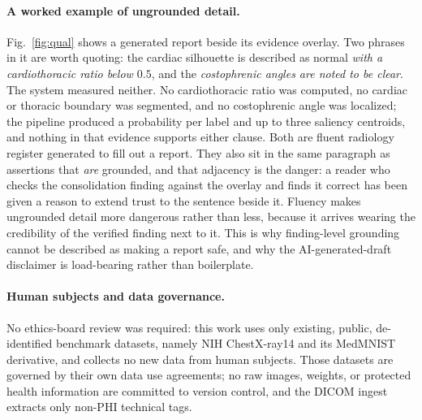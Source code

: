 \documentclass[10pt,twocolumn]{article}
\begin{document}
\paragraph{A worked example of ungrounded detail.} Fig.~\ref{fig:qual} shows a
generated report beside its evidence overlay. Two phrases in it are worth quoting:
the cardiac silhouette is described as normal \emph{with a cardiothoracic ratio
below $0.5$}, and the \emph{costophrenic angles are noted to be clear}. The system
measured neither. No cardiothoracic ratio was computed, no cardiac or thoracic
boundary was segmented, and no costophrenic angle was localized; the pipeline
produced a probability per label and up to three saliency centroids, and nothing
in that evidence supports either clause. Both are fluent radiology register
generated to fill out a report. They also sit in the same paragraph as assertions
that \emph{are} grounded, and that adjacency is the danger: a reader who checks
the consolidation finding against the overlay and finds it correct has been given
a reason to extend trust to the sentence beside it. Fluency makes ungrounded
detail more dangerous rather than less, because it arrives wearing the credibility
of the verified finding next to it. This is why finding-level grounding cannot be
described as making a report safe, and why the AI-generated-draft disclaimer is
load-bearing rather than boilerplate.

\paragraph{Human subjects and data governance.} No ethics-board review was required:
this work uses only existing, public, de-identified benchmark datasets, namely NIH
ChestX-ray14 and its MedMNIST derivative, and collects no new data from human
subjects. Those datasets are governed by their own data use agreements; no raw
images, weights, or protected health information are committed to version control,
and the DICOM ingest extracts only non-PHI technical tags.
\end{document}
